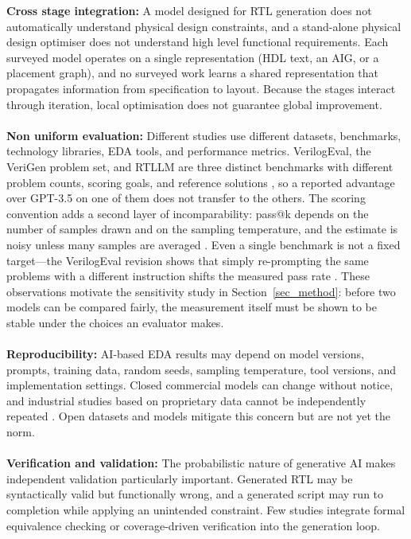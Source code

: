 \documentclass[conference]{IEEEtran}
\begin{document}
\noindent \textbf{Cross stage integration:} A model designed for RTL generation does not automatically understand physical design constraints, and a stand-alone physical design optimiser does not understand high level functional requirements. Each surveyed model operates on a single representation (HDL text, an AIG, or a placement graph), and no surveyed work learns a shared representation that propagates information from specification to layout. Because the stages interact through iteration, local optimisation does not guarantee global improvement.
\\\\
\noindent \textbf{Non uniform evaluation:} Different studies use different datasets, benchmarks, technology libraries, EDA tools, and performance metrics. VerilogEval, the VeriGen problem set, and RTLLM are three distinct benchmarks with different problem counts, scoring goals, and reference solutions \cite{P12_Liu2023,P11_Thakur2024,P16_Lu2024}, so a reported advantage over GPT-3.5 on one of them does not transfer to the others. The scoring convention adds a second layer of incomparability: pass@k depends on the number of samples drawn and on the sampling temperature, and the estimate is noisy unless many samples are averaged \cite{P17_Chen2021Codex}. Even a single benchmark is not a fixed target---the VerilogEval revision shows that simply re-prompting the same problems with a different instruction shifts the measured pass rate \cite{P15_Pinckney2025}. These observations motivate the sensitivity study in Section~\ref{sec_method}: before two models can be compared fairly, the measurement itself must be shown to be stable under the choices an evaluator makes.
\\\\
\noindent \textbf{Reproducibility:} AI-based EDA results may depend on model versions, prompts, training data, random seeds, sampling temperature, tool versions, and implementation settings. Closed commercial models can change without notice, and industrial studies based on proprietary data cannot be independently repeated \cite{P14_Liu2023ChipNeMo}. Open datasets and models \cite{P9_Chowdhury2021,P4_Liu2025} mitigate this concern but are not yet the norm.
\\\\
\noindent \textbf{Verification and validation:} The probabilistic nature of generative AI makes independent validation particularly important. Generated RTL may be syntactically valid but functionally wrong, and a generated script may run to completion while applying an unintended constraint. Few studies integrate formal equivalence checking or coverage-driven verification into the generation loop.
\end{document}
